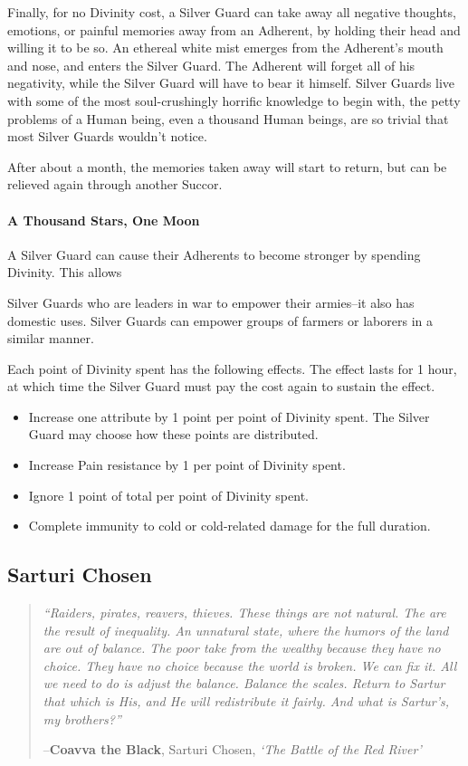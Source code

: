 \documentclass[oneside,11pt,english]{book}
\begin{document}
Finally, for no Divinity cost, a Silver Guard can take away all negative thoughts, emotions, or 
painful memories away from an Adherent, by holding their head and willing it to be so. An 
ethereal white mist emerges from the Adherent's mouth and nose, and enters the Silver Guard. 
The Adherent will forget all of his negativity, while the Silver Guard will have to bear it himself. 
Silver Guards live with some of the most soul-crushingly horrific knowledge to begin with, the 
petty problems of a Human being, even a thousand Human beings, are so trivial that most Silver 
Guards wouldn't notice. 

After about a month, the memories taken away will start to return, but can be relieved again 
through another Succor. 

\paragraph{A Thousand Stars, One Moon}
A Silver Guard can cause their Adherents to become stronger by spending Divinity. This allows 


Silver Guards who are leaders in war to empower their armies--it also has domestic uses. Silver 
Guards can empower groups of farmers or laborers in a similar manner. 


Each point of Divinity spent has the following effects. The effect lasts for 1 hour, at which time 
the Silver Guard must pay the cost again to sustain the effect. 
\begin{itemize}
\item Increase one attribute by 1 point per point of Divinity spent. The Silver Guard may 
choose how these points are distributed. 
\item Increase Pain resistance by 1 per point of Divinity spent. 
\item Ignore 1 point of total  per point of Divinity spent. 
\item Complete immunity to cold or cold-related damage for the full duration. 
\end{itemize}
\subsection{Sarturi Chosen}
\begin{quotation}
	{\emph{“Raiders, pirates, reavers, thieves. These things are not natural. The are the result of inequality. An unnatural state, where the humors of the land are out of balance. The poor take from the wealthy because they have no choice. They have no choice because the world is broken. We can fix it. All we need to do is adjust the balance. Balance the scales. Return to Sartur that which is His, and He will redistribute it fairly. And what is Sartur’s, my brothers?”}

\hfill--\textbf{Coavva the Black}, Sarturi Chosen, \textit{‘The Battle of the Red River’}}
\end{quotation}
\end{document}
